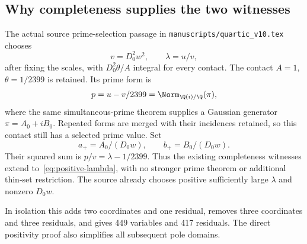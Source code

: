 \subsection{Why completeness supplies the two witnesses}
The actual source prime-selection passage in
\texttt{manuscripts/quartic\_v10.tex} chooses
\[
 v=D_0^2w^2,\qquad\lambda=u/v,
\]
after fixing the scales, with $D_0^2\theta/A$ integral for every contact.
The contact $A=1$, $\theta=1/2399$ is retained. Its prime form is
\[
 p=u-v/2399=\Norm_{\Q(i)/\Q}(\pi),
\]
where the same simultaneous-prime theorem supplies a Gaussian generator
$\pi=A_0+iB_0$. Repeated forms are merged with their incidences retained,
so this contact still has a selected prime value. Set
\[
 a_+=A_0/(D_0w),\qquad b_+=B_0/(D_0w).
\]
Their squared sum is $p/v=\lambda-1/2399$. Thus the existing completeness
witnesses extend to~\eqref{eq:positive-lambda}, with no stronger prime
theorem or additional thin-set restriction. The source already chooses
positive sufficiently large $\lambda$ and nonzero $D_0w$.

In isolation this adds two coordinates and one residual, removes three
coordinates and three residuals, and gives 449 variables and 417 residuals.
The direct positivity proof also simplifies all subsequent pole domains.
